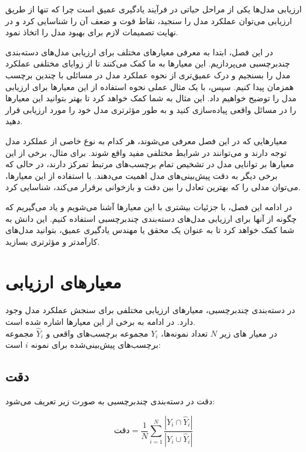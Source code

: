 
ارزیابی مدل‌ها یکی از مراحل حیاتی در فرآیند یادگیری عمیق است چرا که تنها از طریق ارزیابی می‌توان عملکرد مدل را سنجید، نقاط قوت و ضعف آن را شناسایی کرد و در نهایت تصمیمات لازم برای بهبود مدل را اتخاذ نمود.

در این فصل، ابتدا به معرفی معیارهای مختلف برای ارزیابی مدل‌های دسته‌بندی چندبرچسبی می‌پردازیم. این معیارها به ما کمک می‌کنند تا از زوایای مختلفی عملکرد مدل را بسنجیم و درک عمیق‌تری از نحوه عملکرد مدل در مسائلی با چندین برچسب همزمان پیدا کنیم. سپس، با یک مثال عملی نحوه استفاده از این معیارها برای ارزیابی مدل را توضیح خواهیم داد. این مثال به شما کمک خواهد کرد تا بهتر بتوانید این معیارها را در مسائل واقعی پیاده‌سازی کنید و به طور مؤثرتری مدل خود را مورد ارزیابی قرار دهید.

معیارهایی که در این فصل معرفی می‌شوند، هر کدام به نوع خاصی از عملکرد مدل توجه دارند و می‌توانند در شرایط مختلفی مفید واقع شوند. برای مثال، برخی از این معیارها بر توانایی مدل در تشخیص تمام برچسب‌های مرتبط تمرکز دارند، در حالی که برخی دیگر به دقت پیش‌بینی‌های مدل اهمیت می‌دهند. با استفاده از این معیارها، می‌توان مدلی را که بهترین تعادل را بین دقت و بازخوانی برقرار می‌کند، شناسایی کرد.

در ادامه این فصل، با جزئیات بیشتری با این معیارها آشنا می‌شویم و یاد می‌گیریم که چگونه از آنها برای ارزیابی مدل‌های دسته‌بندی چندبرچسبی استفاده کنیم. این دانش به شما کمک خواهد کرد تا به عنوان یک محقق یا مهندس یادگیری عمیق، بتوانید مدل‌های کارآمدتر و مؤثرتری بسازید.
\section{معیارهای ارزیابی}

در دسته‌بندی چندبرچسبی، معیارهای ارزیابی مختلفی برای سنجش عملکرد مدل وجود دارد. در ادامه به برخی از این معیارها اشاره شده است.
\\
در معیار های زیر $N$ تعداد نمونه‌ها، $Y_i$ مجموعه برچسب‌های واقعی و $\hat{Y}_i$ مجموعه برچسب‌های پیش‌بینی‌شده برای نمونه $i$ است:


\subsection{دقت \protect{}}

دقت در دسته‌بندی چندبرچسبی به صورت زیر تعریف می‌شود:

\begin{equation}
	\text{دقت} = \frac{1}{N} \sum_{i=1}^{N} \frac{|Y_i \cap \hat{Y}_i|}{|Y_i \cup \hat{Y}_i|}
	\label{eq:accuracy}
\end{equation}

